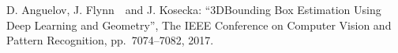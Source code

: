 \begin{mythebibliography}{}
%

%
%
%
%

%



\newpage
\subsection*{}

\leavevmode \\ D. Anguelov, J. Flynn　and J. Kosecka:
\newblock ``3DBounding Box Estimation Using Deep Learning and Geometry'',
\newblock  The IEEE Conference on Computer Vision and Pattern Recognition, pp.~7074--7082, 2017.
\\
            

\end{mythebibliography}
